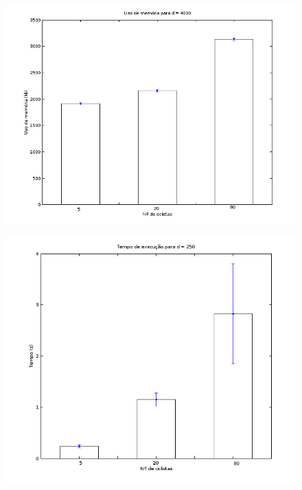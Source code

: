 \documentclass{beamer}
\begin{document}
\begin{frame}
	\begin{figure}[!h]
		\centering
		\includegraphics[scale=0.4]{3.png}
	\end{figure}
\end{frame}

\begin{frame}
	\begin{figure}[!h]
		\centering
		\includegraphics[scale=0.4]{7.png}
	\end{figure}
\end{frame}
\end{document}
